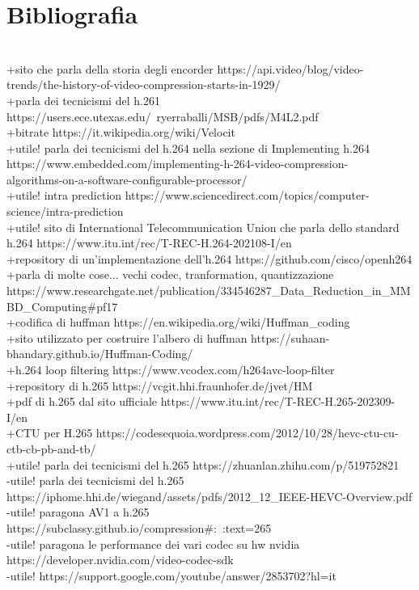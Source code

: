 \documentclass[a4paper,12pt, oneside]{article}
\begin{document}
\section{Bibliografia}
\\+sito che parla della storia degli encorder https://api.video/blog/video-trends/the-history-of-video-compression-starts-in-1929/
\\+parla dei tecnicismi del h.261 https://users.ece.utexas.edu/~ryerraballi/MSB/pdfs/M4L2.pdf
\\+bitrate https://it.wikipedia.org/wiki/Velocit%
\\+utile! parla dei tecnicismi del h.264 nella sezione di Implementing h.264 https://www.embedded.com/implementing-h-264-video-compression-\\algorithms-on-a-software-configurable-processor/
\\+utile! intra prediction https://www.sciencedirect.com/topics/computer-science/intra-prediction
\\+utile! sito di International Telecommunication Union che parla dello standard h.264 https://www.itu.int/rec/T-REC-H.264-202108-I/en
\\+repository di un'implementazione dell'h.264 https://github.com/cisco/openh264
\\+parla di molte cose... vechi codec, tranformation, quantizzazione https://www.researchgate.net/publication/334546287_Data_Reduction_in_MMBD_Computing#pf17
\\+codifica di huffman https://en.wikipedia.org/wiki/Huffman_coding
\\+sito utilizzato per costruire l'albero di huffman https://suhaan-bhandary.github.io/Huffman-Coding/
\\+h.264 loop filtering https://www.vcodex.com/h264avc-loop-filter
\\+repository di h.265 https://vcgit.hhi.fraunhofer.de/jvet/HM
\\+pdf di h.265 dal sito ufficiale https://www.itu.int/rec/T-REC-H.265-202309-I/en
\\+CTU per H.265 https://codesequoia.wordpress.com/2012/10/28/hevc-ctu-cu-ctb-cb-pb-and-tb/
\\+utile! parla dei tecnicismi del h.265 https://zhuanlan.zhihu.com/p/519752821
\\-utile! parla dei tecnicismi del h.265 https://iphome.hhi.de/wiegand/assets/pdfs/2012_12_IEEE-HEVC-Overview.pdf
\\-utile! paragona AV1 a h.265 https://subclassy.github.io/compression#:~:text=265%
\\-utile! paragona le performance dei vari codec su hw nvidia https://developer.nvidia.com/video-codec-sdk
\\-utile! https://support.google.com/youtube/answer/2853702?hl=it
\end{document}
